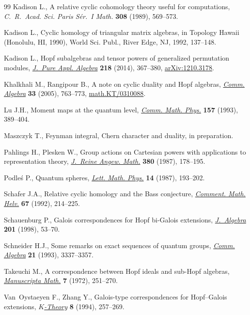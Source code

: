 \documentclass[pdftex]{sigma}
\numberwithin{equation}{section}
\begin{document}
\begin{thebibliography}{99}
Kadison L., A relative cyclic cohomology theory useful for computations,
  \textit{C.~R.~Acad. Sci. Paris S\'er.~I Math.} \textbf{308} (1989), 569--573.

Kadison L., Cyclic homology of triangular matrix algebras, in Topology {H}awaii
  ({H}onolulu, {HI}, 1990), World Sci. Publ., River Edge, NJ, 1992, 137--148.

Kadison L., Hopf subalgebras and tensor powers of generalized permutation
  modules, \href{http://dx.doi.org/10.1016/j.jpaa.2013.06.008}{\textit{J.~Pure Appl. Algebra}} \textbf{218} (2014), 367--380,
  \href{http://arxiv.org/abs/1210.3178}{arXiv:1210.3178}.

Khalkhali M., Rangipour B., A note on cyclic duality and {H}opf algebras,
  \href{http://dx.doi.org/10.1081/AGB-200051130}{\textit{Comm. Algebra}} \textbf{33} (2005), 763--773,
  \href{http://arxiv.org/abs/math.KT/0310088}{math.KT/0310088}.

Lu J.H., Moment maps at the quantum level, \href{http://dx.doi.org/10.1007/BF02099767}{\textit{Comm. Math. Phys.}}
  \textbf{157} (1993), 389--404.

Maszczyk T., {F}eynman integral, {C}hern character and duality, {i}n
  preparation.

Pahlings H., Plesken W., Group actions on {C}artesian powers with applications
  to representation theory, \href{http://dx.doi.org/10.1515/crll.1987.380.178}{\textit{J.~Reine Angew. Math.}} \textbf{380} (1987),
  178--195.

Podle{\'s} P., Quantum spheres, \href{http://dx.doi.org/10.1007/BF00416848}{\textit{Lett. Math. Phys.}} \textbf{14} (1987),
  193--202.

Schafer J.A., Relative cyclic homology and the {B}ass conjecture,
  \href{http://dx.doi.org/10.1007/BF02566497}{\textit{Comment. Math. Helv.}} \textbf{67} (1992), 214--225.

Schauenburg P., Galois correspondences for {H}opf bi-{G}alois extensions,
  \href{http://dx.doi.org/10.1006/jabr.1997.7237}{\textit{J.~Algebra}} \textbf{201} (1998), 53--70.

Schneider H.J., Some remarks on exact sequences of quantum groups,
  \href{http://dx.doi.org/10.1080/00927879308824733}{\textit{Comm. Algebra}} \textbf{21} (1993), 3337--3357.

Takeuchi M., A correspondence between {H}opf ideals and sub-{H}opf algebras,
  \href{http://dx.doi.org/10.1007/BF01579722}{\textit{Manuscripta Math.}} \textbf{7} (1972), 251--270.

Van~Oystaeyen F., Zhang Y., Galois-type correspondences for {H}opf--{G}alois
  extensions, \href{http://dx.doi.org/10.1007/BF00960864}{\textit{$K$-Theory}} \textbf{8} (1994), 257--269.

\end{thebibliography}\LastPageEnding
\end{document}
